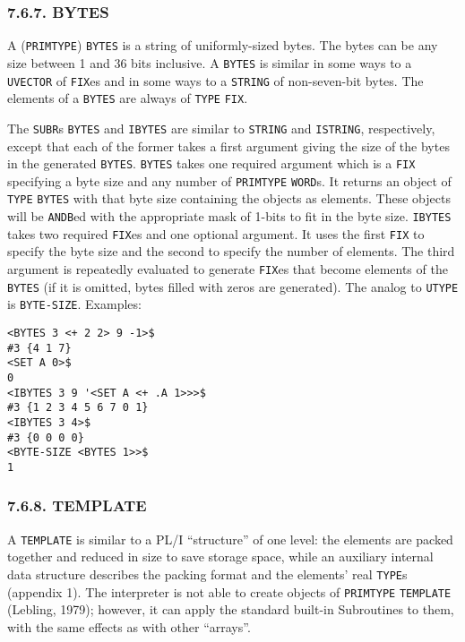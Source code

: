 \documentclass[a4paper,]{article}
\begin{document}
\subsubsection{7.6.7. BYTES}\label{bytes-1}

 A (\texttt{PRIMTYPE}) \texttt{BYTES} is a string of uniformly-sized bytes. The bytes can be
any size between 1 and 36 bits inclusive. A \texttt{BYTES} is similar in some ways to a
\texttt{UVECTOR} of \texttt{FIX}es and in some ways to a \texttt{STRING} of
non-seven-bit bytes. The elements of a \texttt{BYTES} are always of \texttt{TYPE} \texttt{FIX}.

The \texttt{SUBR}s \texttt{BYTES} and \texttt{IBYTES} are similar to \texttt{STRING} and
\texttt{ISTRING}, respectively, except that each of the former takes a first argument giving the size of the bytes in the
generated \texttt{BYTES}. \texttt{BYTES} takes one required argument which is a \texttt{FIX} specifying a byte size and any
number of \texttt{PRIMTYPE} \texttt{WORD}s. It returns an object of \texttt{TYPE} \texttt{BYTES} with that byte size
containing the objects as elements. These objects will be \texttt{ANDB}ed  with the appropriate mask
of 1-bits to fit in the byte size. \texttt{IBYTES} takes two required \texttt{FIX}es and one optional argument. It uses the
first \texttt{FIX} to specify the byte size and the second to specify the number of elements. The third argument is
repeatedly evaluated to generate \texttt{FIX}es that become elements of the \texttt{BYTES} (if it is omitted, bytes filled
with zeros are generated). The analog to \texttt{UTYPE} is \texttt{BYTE-SIZE}. Examples:

\begin{verbatim}
<BYTES 3 <+ 2 2> 9 -1>$
#3 {4 1 7}
<SET A 0>$
0
<IBYTES 3 9 '<SET A <+ .A 1>>>$
#3 {1 2 3 4 5 6 7 0 1}
<IBYTES 3 4>$
#3 {0 0 0 0}
<BYTE-SIZE <BYTES 1>>$
1
\end{verbatim}

\subsubsection{7.6.8. TEMPLATE}\label{template-1}

 A \texttt{TEMPLATE} is similar to a PL/I ``structure'' of one level: the elements are
packed together and reduced in size to save storage space, while an auxiliary internal data structure describes the packing
format and the elements' real \texttt{TYPE}s (appendix 1). The interpreter is not able to create objects of
\texttt{PRIMTYPE} \texttt{TEMPLATE} (Lebling, 1979); however, it can apply the standard built-in Subroutines to them, with
the same effects as with other ``arrays''.
\end{document}
